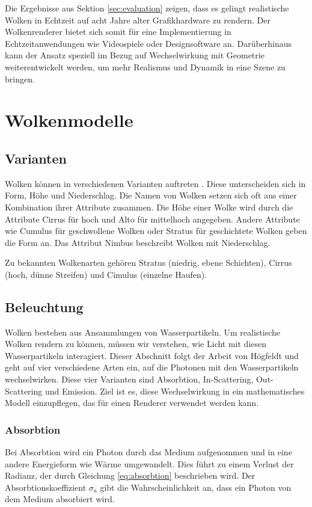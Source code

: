 Die Ergebnisse aus Sektion \ref{sec:evaluation} zeigen, dass es gelingt realistische Wolken in Echtzeit auf acht Jahre alter Grafikhardware zu rendern. Der Wolkenrenderer bietet sich somit für eine Implementierung in Echtzeitanwendungen wie Videospiele oder Designsoftware an. Darüberhinaus kann der Ansatz speziell im Bezug auf Wechselwirkung mit Geometrie weiterentwickelt werden, um mehr Realismus und Dynamik in eine Szene zu bringen.

\section{Wolkenmodelle}
\label{sec:model}

\subsection{Varianten}
Wolken können in verschiedenen Varianten auftreten \cite{Högfeldt16}. Diese unterscheiden sich in Form, Höhe und Niederschlag. Die Namen von Wolken setzen sich oft aus einer Kombination ihrer Attribute zusammen. Die Höhe einer Wolke wird durch die Attribute Cirrus für hoch und Alto für mittelhoch angegeben. Andere Attribute wie Cumulus für geschwollene Wolken oder Stratus für geschichtete Wolken geben die Form an. Das Attribut Nimbus beschreibt Wolken mit Niederschlag.

Zu bekannten Wolkenarten gehören Stratus (niedrig, ebene Schichten), Cirrus (hoch, dünne Streifen) und Cimulus (einzelne Haufen).

\subsection{Beleuchtung}
Wolken bestehen aus Ansammlungen von Wasserpartikeln. Um realistische Wolken rendern zu können, müssen wir verstehen, wie Licht mit diesen Wasserpartikeln interagiert. Dieser Abschnitt folgt der Arbeit von Högfeldt \cite{Högfeldt16} und geht auf vier verschiedene Arten ein, auf die Photonen mit den Wasserpartikeln wechselwirken. Diese vier Varianten sind Absorbtion, In-Scattering, Out-Scattering und Emission. Ziel ist es, diese Wechselwirkung in ein mathematisches Modell einzupflegen, das für einen Renderer verwendet werden kann.

\subsubsection{Absorbtion}
Bei Absorbtion wird ein Photon durch das Medium aufgenommen und in eine andere Energieform wie Wärme umgewandelt. Dies führt zu einem Verlust der Radianz, der durch Gleichung \ref{eq:absorbtion} beschrieben wird. Der Absorbtionskoeffizient $ \sigma_a $ gibt die Wahrscheinlichkeit an, dass ein Photon von dem Medium absorbiert wird.

